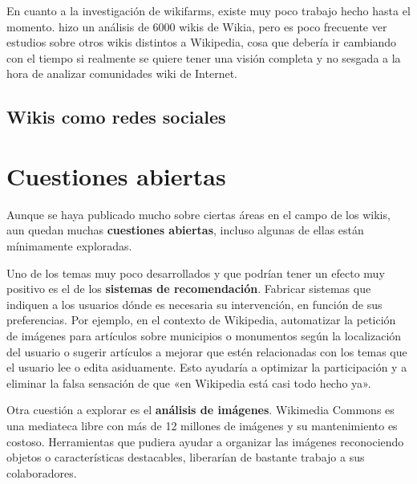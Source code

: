 \documentclass[11pt,onecolumn]{article}
\begin{document}
En cuanto a la investigación de wikifarms, existe muy poco trabajo hecho hasta el momento. \citep{kittur2010} hizo un análisis de 6000 wikis de Wikia, pero es poco frecuente ver estudios sobre otros wikis distintos a Wikipedia, cosa que debería ir cambiando con el tiempo si realmente se quiere tener una visión completa y no sesgada a la hora de analizar comunidades wiki de Internet.

\subsection{Wikis como redes sociales}


\clearpage

\section{Cuestiones abiertas}


Aunque se haya publicado mucho sobre ciertas áreas en el campo de los wikis, aun quedan muchas \textbf{cuestiones abiertas}, incluso algunas de ellas están mínimamente exploradas.


Uno de los temas muy poco desarrollados y que podrían tener un efecto muy positivo es el de los \textbf{sistemas de recomendación}. Fabricar sistemas que indiquen a los usuarios dónde es necesaria su intervención, en función de sus preferencias. Por ejemplo, en el contexto de Wikipedia, automatizar la petición de imágenes para artículos sobre municipios o monumentos según la localización del usuario o sugerir artículos a mejorar que estén relacionadas con los temas que el usuario lee o edita asiduamente. Esto ayudaría a optimizar la participación y a eliminar la falsa sensación de que «en Wikipedia está casi todo hecho ya».

Otra cuestión a explorar es el \textbf{análisis de imágenes}. Wikimedia Commons es una mediateca libre con más de 12 millones de imágenes y su mantenimiento es costoso. Herramientas que pudiera ayudar a organizar las imágenes reconociendo objetos o características destacables, liberarían de bastante trabajo a sus colaboradores.
\end{document}
